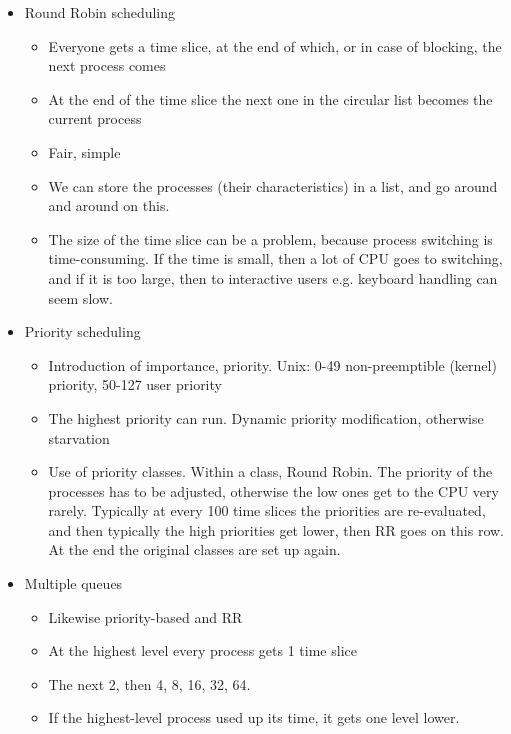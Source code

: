 \documentclass[margin=0px]{article}
\begin{document}
\begin{itemize}
    \item Round Robin scheduling
          \begin{itemize}
              \item Everyone gets a time slice, at the end of which, or in case of blocking, the next process comes
              \item At the end of the time slice the next one in the circular list becomes the current process
              \item Fair, simple
              \item We can store the processes (their characteristics) in a list, and go around and around on this.
              \item The size of the time slice can be a problem, because process switching is time-consuming. If the time is small, then a lot of CPU goes to switching, and if it is too large, then to interactive users e.g. keyboard handling can seem slow.
          \end{itemize}
    \item Priority scheduling
          \begin{itemize}
              \item Introduction of importance, priority. Unix: 0-49 non-preemptible (kernel) priority, 50-127 user priority
              \item The highest priority can run. Dynamic priority modification, otherwise starvation
              \item Use of priority classes. Within a class, Round Robin. The priority of the processes has to be adjusted, otherwise the low ones get to the CPU very rarely. Typically at every 100 time slices the priorities are re-evaluated, and then typically the high priorities get lower, then RR goes on this row. At the end the original classes are set up again.
          \end{itemize}
    \item Multiple queues
          \begin{itemize}
              \item Likewise priority-based and RR
              \item At the highest level every process gets 1 time slice
              \item The next 2, then 4, 8, 16, 32, 64.
              \item If the highest-level process used up its time, it gets one level lower.
          \end{itemize}

\end{itemize}
\end{document}
